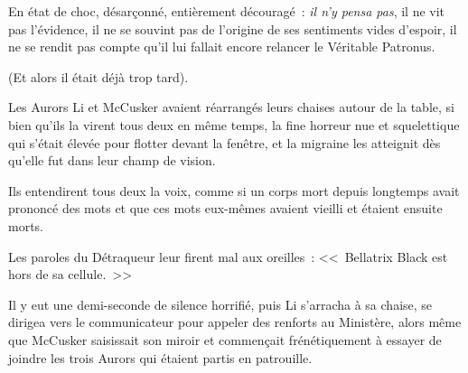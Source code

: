 En état de choc, désarçonné, entièrement découragé~: \emph{il n'y pensa pas}, il ne vit pas l'évidence, il ne se souvint pas de l'origine de ses sentiments vides d'espoir, il ne se rendit pas compte qu'il lui fallait encore relancer le Véritable Patronus.

(Et alors il était déjà trop tard).

\later

Les Aurors Li et McCusker avaient réarrangés leurs chaises autour de la table, si bien qu'ils la virent tous deux en même temps, la fine horreur nue et squelettique qui s'était élevée pour flotter devant la fenêtre, et la migraine les atteignit dès qu'elle fut dans leur champ de vision.

Ils entendirent tous deux la voix, comme si un corps mort depuis longtemps avait prononcé des mots et que ces mots eux-mêmes avaient vieilli et étaient ensuite morts.

Les paroles du Détraqueur leur firent mal aux oreilles~: <<~Bellatrix Black est hors de sa cellule.~>>

Il y eut une demi-seconde de silence horrifié, puis Li s'arracha à sa chaise, se dirigea vers le communicateur pour appeler des renforts au Ministère, alors même que McCusker saisissait son miroir et commençait frénétiquement à essayer de joindre les trois Aurors qui étaient partis en patrouille.

